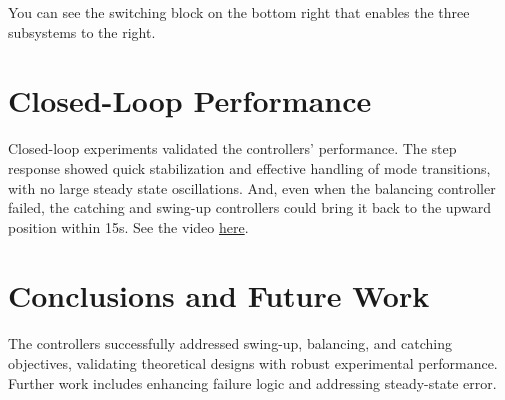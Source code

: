 \documentclass[12pt]{article}
\begin{document}
You can see the switching block on the bottom right that enables the three subsystems to the right.
\section{Closed-Loop Performance}

Closed-loop experiments validated the controllers' performance. The step response showed quick stabilization and effective handling of mode transitions, with no large steady state oscillations. And, even when the balancing controller failed, the catching and swing-up controllers could bring it back to the upward position within 15s. 
See the video \href{https://youtu.be/cFawTXDfmD8}{here}.



\section{Conclusions and Future Work}
The controllers successfully addressed swing-up, balancing, and catching objectives, validating theoretical designs with robust experimental performance. Further work includes enhancing failure logic and addressing steady-state error. 
\end{document}
